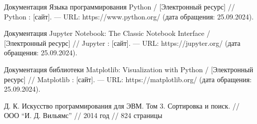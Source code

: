 \begin{thebibliography}{}
   Документация Языка программирования Python /  [Электронный ресурс] // Python : [сайт]. — URL: https://www.python.org/ (дата обращения: 25.09.2024).
  
   Документация Jupyter Notebook: The Classic Notebook Interface /  [Электронный ресурс] // Jupyter : [сайт]. — URL: https://jupyter.org/ (дата обращения: 25.09.2024).

   Документация библиотеки Matplotlib: Visualization with Python /  [Электронный ресурс] // Matplotlib : [сайт]. — URL: https://matplotlib.org/ (дата обращения: 25.09.2024).

   Д. К. Искусство программирования для ЭВМ. Том 3. Сортировка и поиск. // ООО ``И. Д. Вильямс'' // 2014 год // 824 страницы
\end{thebibliography}